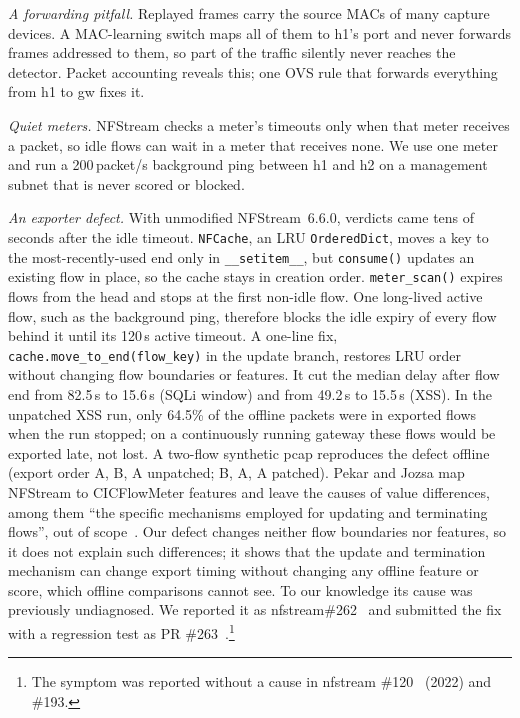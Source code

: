 \emph{A forwarding pitfall.} Replayed frames carry the source MACs of many capture devices. A MAC-learning switch maps all of them to h1's port and never forwards frames addressed to them, so part of the traffic silently never reaches the detector. Packet accounting reveals this; one OVS rule that forwards everything from h1 to gw fixes it.

\emph{Quiet meters.} NFStream checks a meter's timeouts only when that meter receives a packet, so idle flows can wait in a meter that receives none. We use one meter and run a 200\,packet/s background ping between h1 and h2 on a management subnet that is never scored or blocked.

\emph{An exporter defect.} With unmodified NFStream~6.6.0, verdicts came tens of seconds after the idle timeout. \texttt{NFCache}, an LRU \texttt{OrderedDict}, moves a key to the most-recently-used end only in \texttt{\_\_setitem\_\_}, but \texttt{consume()} updates an existing flow in place, so the cache stays in creation order. \texttt{meter\_scan()} expires flows from the head and stops at the first non-idle flow. One long-lived active flow, such as the background ping, therefore blocks the idle expiry of every flow behind it until its 120\,s active timeout. A one-line fix, \texttt{cache.move\_to\_end(flow\_key)} in the update branch, restores LRU order without changing flow boundaries or features. It cut the median delay after flow end from 82.5\,s to 15.6\,s (SQLi window) and from 49.2\,s to 15.5\,s (XSS). In the unpatched XSS run, only 64.5\% of the offline packets were in exported flows when the run stopped; on a continuously running gateway these flows would be exported late, not lost. A two-flow synthetic pcap reproduces the defect offline (export order A, B, A unpatched; B, A, A patched). Pekar and Jozsa map NFStream to CICFlowMeter features and leave the causes of value differences, among them ``the specific mechanisms employed for updating and terminating flows'', out of scope~\cite{pekar2024integrity}. Our defect changes neither flow boundaries nor features, so it does not explain such differences; it shows that the update and termination mechanism can change export timing without changing any offline feature or score, which offline comparisons cannot see. To our knowledge its cause was previously undiagnosed. We reported it as nfstream\#262~\cite{nfstream262} and submitted the fix with a regression test as PR \#263~\cite{nfstream263}.\footnote{The symptom was reported without a cause in nfstream \#120~\cite{nfstream120} (2022) and \#193.}
